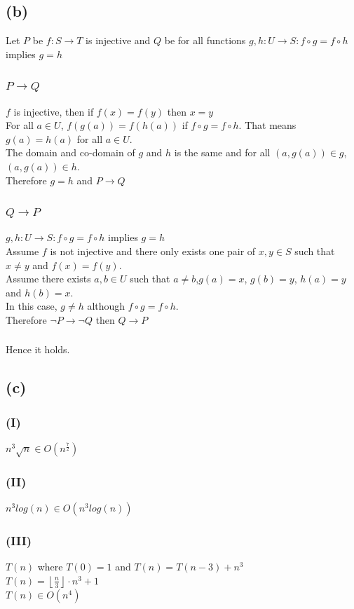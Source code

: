 \documentclass{article} %
\begin{document}
\subsection*{(b)}
Let $P$ be $f:S \to T$ is injective and $Q$ be for all functions $g,h: U \to S: f\circ g= f\circ h$ implies $g = h$
\subsubsection*{$P \to Q$}
$f$ is injective, then if $f(x) = f(y)$ then $x = y$\\
For all $a \in U$, $f(g(a))= f(h(a))$ if $f\circ g = f\circ h$. That means $g(a) = h(a)$ for all $a \in U$.\\ 
The domain and co-domain of $g$ and $h$ is the same and for all $(a, g(a))\in g$, $(a, g(a))\in h$.\\
Therefore $g=h$ and $P \to Q$
\subsubsection*{$Q \to P$}
$g,h: U \to S: f\circ g= f\circ h$ implies $g = h$\\
Assume $f$ is not injective and there only exists one pair of $x, y \in S$ such that $x\neq y$ and $f(x) = f(y)$.\\
Assume there exists $a,b\in U$ such that $a\neq b$,$g(a) = x$, $g(b) = y$, $h(a) = y$ and $h(b) = x$.\\
In this case, $g\neq h$ although $f\circ g = f \circ h$.\\
Therefore $\neg P \to \neg Q$ then $Q \to P$
\subsubsection*{}
Hence it holds.
\subsection*{(c)}
\subsubsection*{(I)}
$n^3\sqrt{n} \in O(n^{\frac{7}{2}})$
\subsubsection*{(II)}
$n^3 log(n) \in O(n^3 log(n))$
\subsubsection*{(III)}
$T(n)$ where $T(0) = 1$ and $T(n) = T(n - 3) + n^3$\\
$T(n) = \left\lfloor \frac{n}{3}\right\rfloor \cdot n^3 + 1$\\
$T(n) \in O(n^4)$
\end{document}
